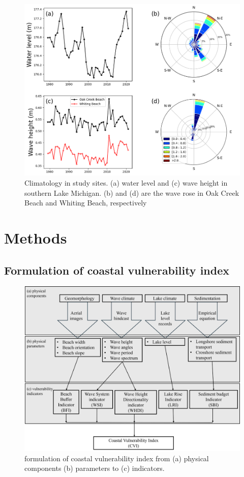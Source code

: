 \begin{figure}[htbp]
  \centering
  \includegraphics[width=1\textwidth]{chapter5/resources/cites_climates.png}
  \caption{Climatology in study sites. (a) water level and (c) wave height in southern Lake Michigan. (b)
  and (d) are the wave rose in Oak Creek Beach and Whiting Beach, respectively}
  \label{fig:c5_sites_climate}
\end{figure}

\section{Methods}
\label{c5_Methods}

\subsection{Formulation of coastal vulnerability index}
\label{Formulation of coastal vulnerability index}

\begin{figure}[htbp]
  \centering
  \includegraphics[width=1\textwidth]{chapter5/resources/c5_methods_graph.png}
  \caption{formulation of coastal vulnerability index from (a) physical
  components (b) parameters to (c) indicators.}
  \label{fig:c5_method_cvi}
\end{figure}

